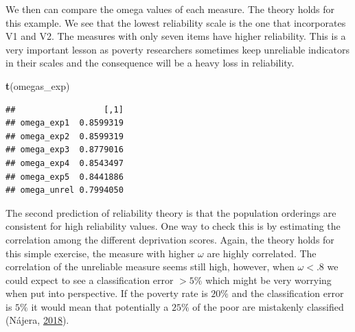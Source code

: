 \documentclass[]{book}
\newenvironment{Shaded}{\begin{snugshade}}{\end{snugshade}}
\newcommand{\KeywordTok}[1]{\textcolor[rgb]{0.13,0.29,0.53}{\textbf{#1}}}
\newcommand{\NormalTok}[1]{#1}
\begin{document}
We then can compare the omega values of each measure. The theory holds for this example. We see that the lowest reliability scale is the one that incorporates V1 and V2. The measures with only seven items have higher reliability. This is a very important lesson as poverty researchers sometimes keep unreliable indicators in their scales and the consequence will be a heavy loss in reliability.

\begin{Shaded}
\begin{Highlighting}[]
\KeywordTok{t}\NormalTok{(omegas_exp)}
\end{Highlighting}
\end{Shaded}

\begin{verbatim}
##                  [,1]
## omega_exp1  0.8599319
## omega_exp2  0.8599319
## omega_exp3  0.8779016
## omega_exp4  0.8543497
## omega_exp5  0.8441886
## omega_unrel 0.7994050
\end{verbatim}

The second prediction of reliability theory is that the population orderings are consistent for high reliability values. One way to check this is by estimating the correlation among the different deprivation scores. Again, the theory holds for this simple exercise, the measure with higher \(\omega\) are highly correlated. The correlation of the unreliable measure seems still high, however, when \(\omega<.8\) we could expect to see a classification error \(>5\%\) which might be very worrying when put into perspective. If the poverty rate is \(20\%\) and the classification error is \(5\%\) it would mean that potentially a \(25\%\) of the poor are mistakenly classified (Nájera, \protect\hyperlink{ref-Najera2018}{2018}).
\end{document}
